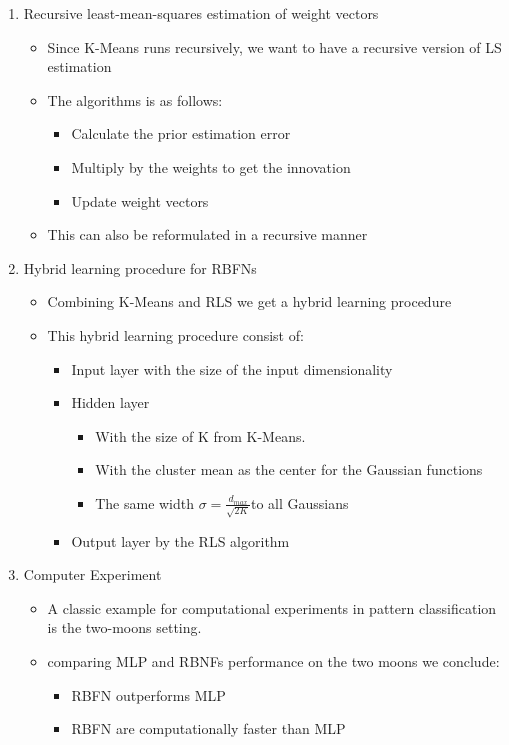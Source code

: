 \documentclass{scrartcl}
\begin{document}
\begin{enumerate}
\item Recursive least-mean-squares estimation of weight vectors
	\begin{itemize}
	\item Since K-Means runs recursively, we want to have a recursive version of LS estimation
	\item The algorithms is as follows:
		\begin{itemize}
		\item Calculate the prior estimation error
		\item Multiply by the weights to get the innovation
		\item Update weight vectors
		\end{itemize}
	\item This can also be reformulated in a recursive manner
	\end{itemize}
	
\item Hybrid learning procedure for RBFNs
	\begin{itemize}
	\item Combining K-Means and RLS we get a hybrid learning procedure
	\item This hybrid learning procedure consist of:
		\begin{itemize}
		\item Input layer with the size of the input dimensionality
		\item Hidden layer
			\begin{itemize}
			\item With the size of K from K-Means.
			\item With the cluster mean as the center for the Gaussian functions
			\item The same width $\sigma  = \frac{d_{max}}{\sqrt{2K}}$to all Gaussians
			\end{itemize} 
		\item Output layer by the RLS algorithm
		\end{itemize}
	\end{itemize}
	
\item Computer Experiment
	\begin{itemize}
	\item A classic example for computational experiments in pattern classification is the two-moons setting.
	\item comparing MLP and RBNFs performance on the two moons we conclude:
		\begin{itemize}
		\item RBFN outperforms MLP
		\item RBFN are computationally faster than MLP
		\end{itemize}
	\end{itemize}
	

\end{enumerate}
\end{document}
